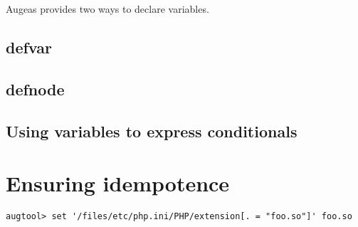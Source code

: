 \label{sec:variables} 

Augeas provides two ways to declare variables.

\subsection{defvar}

 

\subsection{defnode}

 


\subsection{Using variables to express conditionals}

\section{Ensuring idempotence}

\label{sec:ensuring_idempotence} 

\begin{verbatim}
augtool> set '/files/etc/php.ini/PHP/extension[. = "foo.so"]' foo.so
\end{verbatim}

